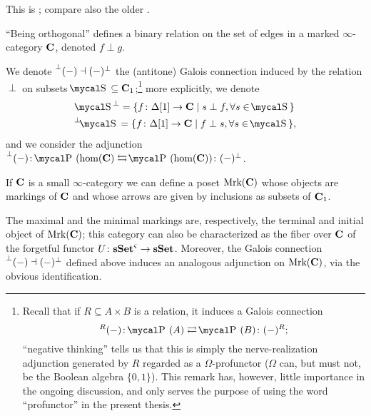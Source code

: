 \begin{remark}
This is \adef \cite[\textbf{5.2.8.1}]{HTT}; compare also the older \cite[\adef \textbf{3.1}]{JanelidzeMarkl}.
\end{remark}
\begin{remark}
``Being orthogonal'' defines a binary relation on the set of edges in a marked $\infty$\hyp{}category $\textbf{C}$, denoted $f\perp g$.
\end{remark}
\begin{notat}
We denote $\prescript{\perp}{}{(-)}\dashv (-)^\perp$ the (antitone) Galois connection induced by the relation $\perp$ on subsets $\mS\subseteq \CC_1$;\footnote{Recall that if $R\subseteq A\times B$ is a relation, it induces a Galois connection $${}^{R}(-) \colon \mcal{P}\,(A)\rightleftarrows \mcal{P}\,(B)\colon (-)^{R};$$ ``negative thinking'' tells us that this is simply the nerve\hyp{}realization adjunction generated by $R$ regarded as a $\Omega$\hyp{}profunctor ($\Omega$ can, but must not, be the Boolean algebra $\{0,1\}$). This remark has, however, little importance in the ongoing discussion, and only serves the purpose of using the word ``profunctor'' in the present thesis.} more explicitly, we denote
\begin{gather*}
\mS^\perp = \{f\colon \Delta[1]\to \CC\mid s \perp f,  \forall s\in \mS\} \\
\prescript{\perp}{}{\mS} = \{f\colon \Delta[1]\to \CC\mid f \perp s,  \forall s\in \mS\},
\end{gather*}
and we consider the adjunction $\prescript{\perp}{}{(-)}\colon \mcal{P}\,(\hom(\CC)\leftrightarrows \mcal{P}\,(\hom(\CC))\colon (-)^\perp$.
\end{notat}
\begin{definition}\label{def:mrkc}
If $\textbf{C}$ is a small $\infty$\hyp{}category we can define a poset $\text{Mrk}(\textbf{C})$ whose objects are markings of $\textbf{C}$ and whose arrows are given by inclusions as subsets of $\textbf{C}_1$. 
\end{definition}
\begin{remark}
The maximal and the minimal markings are, respectively, the terminal and initial object of $\text{Mrk}(\textbf{C})$; this category can also be characterized as the fiber over $\textbf{C}$ of the forgetful functor $U\colon \textbf{sSet}^\varsigma \to \textbf{sSet}$. Moreover, the Galois connection $\prescript{\perp}{}{(-)}\dashv (-)^\perp$ defined above induces an analogous adjunction on $\text{Mrk}(\textbf{C})$, via the obvious identification. 
\end{remark}
